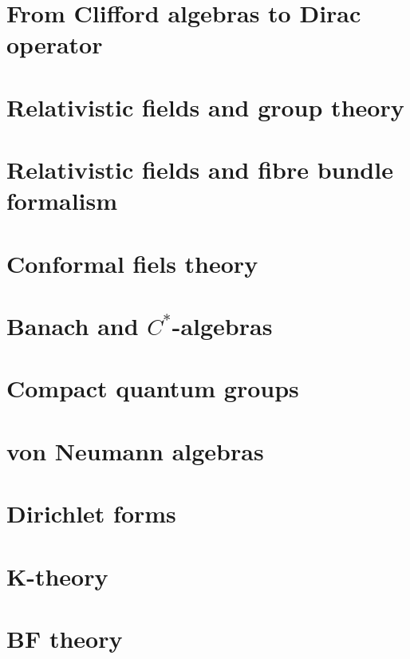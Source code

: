 \chapter{From Clifford algebras to Dirac operator}



\chapter{Relativistic fields and group theory}


\chapter{Relativistic fields and fibre bundle formalism}


\chapter{Conformal fiels theory}


\chapter{Banach and \texorpdfstring{$C^*$}{C*}-algebras}
   
   
   

\chapter{Compact quantum groups}


\chapter{von Neumann algebras}





\chapter{Dirichlet forms}


\chapter{K-theory}


\chapter{BF theory}


